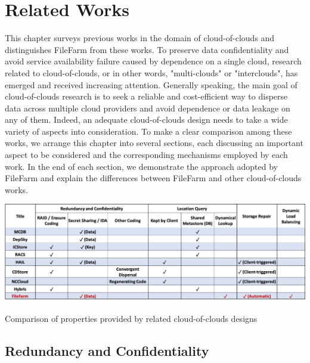 \chapter{Related Works}
\label{c:related_works}

This chapter surveys previous works in the domain of cloud-of-clouds and distinguishes FileFarm from these works. To preserve data confidentiality and avoid service availability failure caused by dependence on a single cloud, research related to cloud-of-clouds, or in other words, "multi-clouds" or "interclouds", has emerged and received increasing attention. Generally speaking, the main goal of cloud-of-clouds research is to seek a reliable and cost-efficient way to disperse data across multiple cloud providers and avoid dependence or data leakage on any of them. Indeed, an adequate cloud-of-clouds design needs to take a wide variety of aspects into consideration. To make a clear comparison among these works, we arrange this chapter into several sections, each discussing an important aspect to be considered and the corresponding mechanisms employed by each work. In the end of each section, we demonstrate the approach adopted by FileFarm and explain the differences between FileFarm and other cloud-of-clouds works.

\begin{table}[!b]
\centering
  \includegraphics[width=15cm]{tables/table_property_comparison.png}
  \caption{Comparison of properties provided by related cloud-of-clouds designs}
  \label{table:propertycomparison}
\end{table}

\newpage

\section{Redundancy and Confidentiality}
\label{ss:cocredundancyandconfidentiality}

